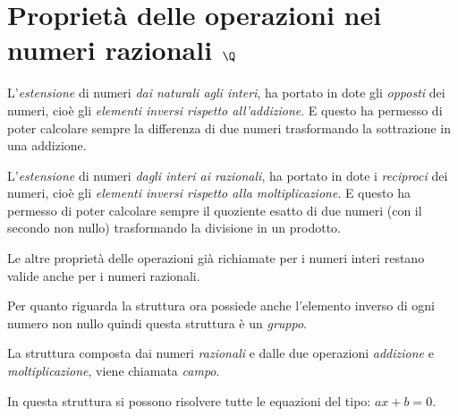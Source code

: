 \section{Proprietà delle operazioni nei numeri razionali $\Q$}
\label{sec:razionali_proprieta}

L'\emph{estensione} di numeri \emph{dai naturali agli interi}, 
ha portato in dote gli \emph{opposti} dei numeri, cioè gli 
\emph{elementi inversi rispetto all'addizione}. 
E questo ha permesso di poter calcolare sempre la differenza di due numeri 
trasformando la sottrazione in una addizione.

L'\emph{estensione} di numeri \emph{dagli interi ai razionali},
ha portato in dote i \emph{reciproci} dei numeri, cioè gli 
\emph{elementi inversi rispetto alla moltiplicazione}. 
E questo ha permesso di poter calcolare sempre il quoziente esatto di due 
numeri (con il secondo non nullo) trasformando la divisione in un prodotto.

Le altre proprietà delle operazioni già richiamate per i numeri interi 
restano valide anche per i numeri razionali.

Per quanto riguarda la struttura  ora possiede anche 
l'elemento inverso di ogni numero non nullo quindi questa struttura è un 
\emph{gruppo}.

La struttura composta dai numeri \emph{razionali} e dalle due operazioni 
\emph{addizione} e \emph{moltiplicazione},  viene 
chiamata \emph{campo}.

In questa struttura si possono risolvere tutte le equazioni del tipo:
\(ax +b = 0\).

% 

